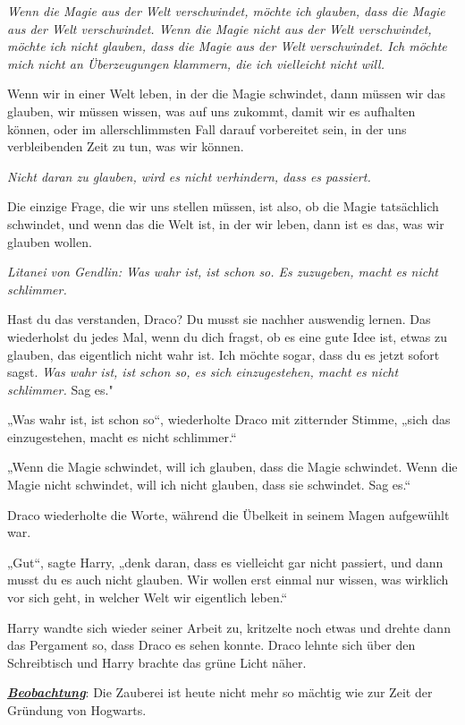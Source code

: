 {\emph{Wenn die Magie aus der Welt verschwindet, möchte ich glauben, dass die Magie aus der Welt verschwindet. Wenn die Magie nicht aus der Welt verschwindet, möchte ich nicht glauben, dass die Magie aus der Welt verschwindet. Ich möchte mich nicht an Überzeugungen klammern, die ich vielleicht nicht will.}

Wenn wir in einer Welt leben, in der die Magie schwindet, dann müssen wir das glauben, wir müssen wissen, was auf uns zukommt, damit wir es aufhalten können, oder im allerschlimmsten Fall darauf vorbereitet sein, in der uns verbleibenden Zeit zu tun, was wir können.

\emph{Nicht daran zu glauben, wird es nicht verhindern, dass es passiert.}

Die einzige Frage, die wir uns stellen müssen, ist also, ob die Magie tatsächlich schwindet, und wenn das die Welt ist, in der wir leben, dann ist es das, was wir glauben wollen.

\emph{Litanei von Gendlin: Was wahr ist, ist schon so. Es zuzugeben, macht es nicht schlimmer.}

Hast du das verstanden, Draco? Du musst sie nachher auswendig lernen. Das wiederholst du jedes Mal, wenn du dich fragst, ob es eine gute Idee ist, etwas zu glauben, das eigentlich nicht wahr ist. Ich möchte sogar, dass du es jetzt sofort sagst. \emph{Was wahr ist, ist schon so, es sich einzugestehen, macht es nicht schlimmer.} Sag es."

„Was wahr ist, ist schon so“, wiederholte Draco mit zitternder Stimme, „sich das einzugestehen, macht es nicht schlimmer.“

„Wenn die Magie schwindet, will ich glauben, dass die Magie schwindet. Wenn die Magie nicht schwindet, will ich nicht glauben, dass sie schwindet. Sag es.“

Draco wiederholte die Worte, während die Übelkeit in seinem Magen aufgewühlt war.

„Gut“, sagte Harry, „denk daran, dass es vielleicht gar nicht passiert, und dann musst du es auch nicht glauben. Wir wollen erst einmal nur wissen, was wirklich vor sich geht, in welcher Welt wir eigentlich leben.“

Harry wandte sich wieder seiner Arbeit zu, kritzelte noch etwas und drehte dann das Pergament so, dass Draco es sehen konnte. Draco lehnte sich über den Schreibtisch und Harry brachte das grüne Licht näher.

\emph{\textbf{\uline{Beobachtung}}}: Die Zauberei ist heute nicht mehr so mächtig wie zur Zeit der Gründung von Hogwarts.

}
